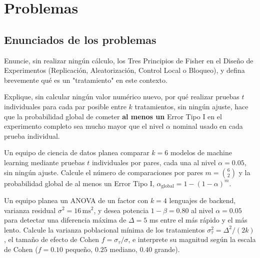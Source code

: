 \section*{Problemas}

\subsection*{Enunciados de los problemas}

\begin{problema}
	\label{prob:8d16ad2}
	Enuncie, sin realizar ningún cálculo, los Tres Principios de Fisher en el Diseño de Experimentos (Replicación, Aleatorización, Control Local o Bloqueo), y defina brevemente qué es un "tratamiento" en este contexto.
\end{problema}

\begin{problema}
	\label{prob:0b5e19a}
	Explique, sin calcular ningún valor numérico nuevo, por qué realizar pruebas $t$ individuales para cada par posible entre $k$ tratamientos, sin ningún ajuste, hace que la probabilidad global de cometer \textbf{al menos un} Error Tipo I en el experimento completo sea mucho mayor que el nivel $\alpha$ nominal usado en cada prueba individual.
\end{problema}

\begin{problema}
	\label{prob:433c810}
	Un equipo de ciencia de datos planea comparar $k=6$ modelos de machine learning mediante pruebas $t$ individuales por pares, cada una al nivel $\alpha=0.05$, sin ningún ajuste. Calcule el número de comparaciones por pares $m=\binom{6}{2}$ y la probabilidad global de al menos un Error Tipo I, $\alpha_{\text{global}}=1-(1-\alpha)^m$.
\end{problema}

\begin{problema}
	\label{prob:9bff013}
	Un equipo planea un ANOVA de un factor con $k=4$ lenguajes de backend, varianza residual $\sigma^2=16\,\text{ms}^2$, y desea potencia $1-\beta=0.80$ al nivel $\alpha=0.05$ para detectar una diferencia máxima de $\Delta=5$ ms entre el más rápido y el más lento. Calcule la varianza poblacional mínima de los tratamientos $\sigma_\tau^2=\Delta^2/(2k)$, el tamaño de efecto de Cohen $f=\sigma_\tau/\sigma$, e interprete su magnitud según la escala de Cohen ($f=0.10$ pequeño, $0.25$ mediano, $0.40$ grande).
\end{problema}

